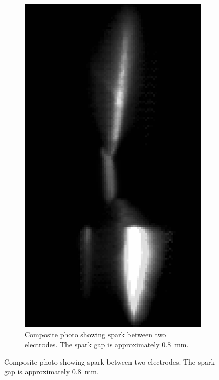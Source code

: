             \begin{figure}[!ht]
                \centering
                \begin{subfigure}[t]{0.25\textwidth}
                    \centering
                    \includegraphics[width=\textwidth]{assets/4 experiments/Composite photo spark.png}
                    \caption{Composite photo showing spark between two electrodes. The spark gap is approximately \qty{0.8}{mm}.}

\end{subfigure}
\end{figure}
